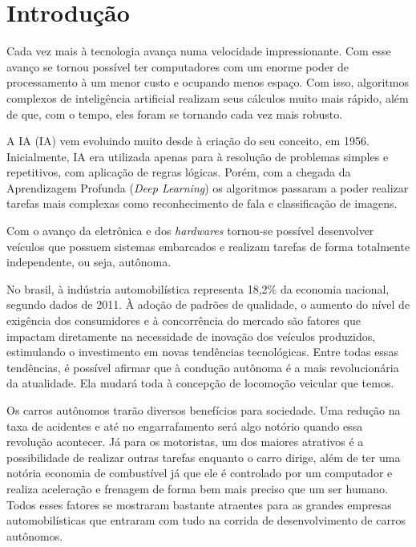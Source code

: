 \chapter{Introdução}
\label{cap:introducao}

Cada vez mais à tecnologia avança numa velocidade impressionante. Com esse avanço se tornou possível ter computadores com um enorme poder de processamento à um menor custo e ocupando menos espaço. Com isso, algoritmos complexos de inteligência artificial realizam seus cálculos muito mais rápido, além de que, com o tempo, eles foram se tornando cada vez mais robusto. \cite{rodrigues2017fundamentos} 

A \acrlong{IA} (IA) vem evoluindo muito desde à criação do seu conceito, em 1956. Inicialmente, IA era utilizada apenas para à resolução de problemas simples e repetitivos, com aplicação de regras lógicas. Porém, com a chegada da Aprendizagem Profunda (\textit{Deep Learning}) os algoritmos passaram a poder realizar tarefas mais complexas como reconhecimento de fala e classificação de imagens. \cite{goodfellow2016deep}

Com o avanço da eletrônica e dos \textit{hardwares} tornou-se possível desenvolver veículos que possuem sistemas embarcados e realizam tarefas de forma totalmente independente, ou seja, autônoma. \cite{rodrigues2017fundamentos}

No brasil, à indústria automobilística representa 18,2\% da economia nacional, segundo dados de 2011. À adoção de padrões de qualidade, o aumento do nível de exigência dos consumidores e à concorrência do mercado são fatores que impactam diretamente na necessidade de inovação dos veículos produzidos, estimulando o investimento em novas tendências tecnológicas. Entre todas essas tendências, é possível afirmar que à condução autônoma é a mais revolucionária da atualidade. Ela mudará toda à concepção de locomoção veicular que temos. \cite{ rodrigues2017fundamentos}

Os carros autônomos trarão diversos benefícios para sociedade. Uma redução na taxa de acidentes e até no engarrafamento será algo notório quando essa revolução acontecer. Já para os motoristas, um dos maiores atrativos é a possibilidade de realizar outras tarefas enquanto o carro dirige, além de ter uma notória economia de combustível já que ele é controlado por um computador e realiza aceleração e frenagem de forma bem mais preciso que um ser humano. Todos esses fatores se mostraram bastante atraentes para as grandes empresas automobilísticas que entraram com tudo na corrida de desenvolvimento de carros autônomos. \cite{inproceedings,rodrigues2017fundamentos}

